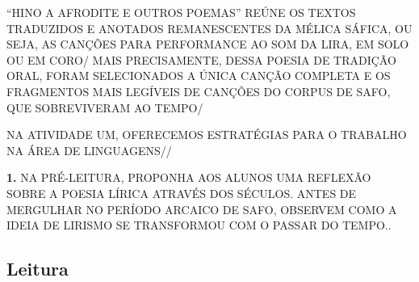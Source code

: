 \documentclass[12pt]{extarticle}
\begin{document}
“HINO A AFRODITE E OUTROS POEMAS” REÚNE OS TEXTOS TRADUZIDOS E ANOTADOS REMANESCENTES DA MÉLICA SÁFICA, OU SEJA, AS CANÇÕES PARA PERFORMANCE AO SOM DA LIRA, EM SOLO OU EM CORO/ MAIS
PRECISAMENTE, DESSA POESIA DE TRADIÇÃO ORAL, FORAM SELECIONADOS A ÚNICA CANÇÃO COMPLETA E OS FRAGMENTOS MAIS LEGÍVEIS DE CANÇÕES DO CORPUS DE SAFO, QUE SOBREVIVERAM AO TEMPO/
 
NA ATIVIDADE UM, OFERECEMOS ESTRATÉGIAS PARA O TRABALHO NA ÁREA DE LINGUAGENS//


\textbf{1.} NA PRÉ-LEITURA, PROPONHA AOS ALUNOS UMA REFLEXÃO SOBRE A
POESIA LÍRICA ATRAVÉS DOS SÉCULOS. ANTES DE MERGULHAR NO PERÍODO ARCAICO
DE SAFO, OBSERVEM COMO A IDEIA DE LIRISMO SE TRANSFORMOU COM O PASSAR DO
TEMPO..


\subsection{Leitura}






\end{document}
